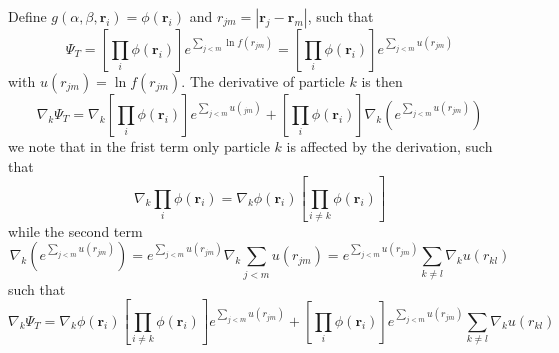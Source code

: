 \documentclass[a4paper, 10pt, english]{revtex4-2} %
\begin{document}
    Define $g(\alpha, \beta, \mathbf{r}_i) = \phi(\mathbf{r}_i)$ and $r_{jm} = |\mathbf{r}_j - \mathbf{r}_m|$, such that
    \begin{equation}
            \Psi_T 
        =   \left[\prod_i\phi(\mathbf{r}_i)\right] e^{\sum_{j<m} \ln{f(r_{jm})}}
        =   \left[\prod_i\phi(\mathbf{r}_i)\right] e^{\sum_{j<m} u(r_{jm})}
    \end{equation}
    with $u(r_{jm}) = \ln{f(r_{jm})}$. The derivative of particle $k$ is then
    \begin{equation}
            \nabla_k\Psi_T 
        =   \nabla_k\left[\prod_i \phi(\mathbf{r}_i)\right]e^{\sum_{j<m} u(_{jm})} + \left[\prod_i\phi(\mathbf{r}_i)\right] \nabla_k\left(e^{\sum_{j<m} u(r_{jm})}\right)
    \end{equation}
    we note that in the frist term only particle $k$ is affected by the derivation, such that
    \begin{equation}
            \nabla_k\prod_i \phi(\mathbf{r}_i) 
        =   \nabla_k\phi(\mathbf{r}_i)\left[\prod_{i\neq k}\phi(\mathbf{r}_i)\right]
    \end{equation}
    while the second term
    \begin{equation}
                \nabla_k\left(e^{\sum_{j<m} u(r_{jm})}\right)
            =   e^{\sum_{j<m} u(r_{jm})} \nabla_k\sum_{j<m}u(r_{jm})
            =   e^{\sum_{j<m} u(r_{jm})} \sum_{k\neq l}\nabla_k u(r_{kl})
    \end{equation}
    such that
    \begin{equation}
            \nabla_k\Psi_T 
        =   \nabla_k\phi(\mathbf{r}_i)\left[\prod_{i\neq k}\phi(\mathbf{r}_i)\right] e^{\sum_{j<m} u(r_{jm})} + \left[\prod_i\phi(\mathbf{r}_i)\right] e^{\sum_{j<m} u(r_{jm})} \sum_{k\neq l}\nabla_k u(r_{kl})
    \end{equation}     
\end{document}
